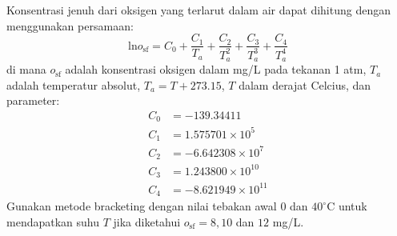 \begin{soal}
Konsentrasi jenuh dari oksigen yang terlarut dalam air dapat
dihitung dengan menggunakan persamaan:
\begin{equation*}
\mathrm{ln}o_{\mathrm{sf}} = C_{0} + \frac{C_{1}}{T_{a}} +
\frac{C_{2}}{T_{a}^{2}} + \frac{C_{3}}{T_{a}^{3}} +
\frac{C_{4}}{T_{a}^{4}}
\end{equation*}
di mana $o_{\mathrm{sf}}$ adalah konsentrasi oksigen dalam mg/L pada tekanan
1 atm, $T_{a}$ adalah temperatur absolut, $T_{a} = T + 273.15$, $T$ dalam
derajat Celcius, dan parameter:
\begin{align*}
C_{0} & = -139.34411 \\
C_{1} & = 1.575701 \times 10^5 \\
C_{2} & = -6.642308 \times 10^7 \\
C_{3} & = 1.243800 \times 10^{10} \\
C_{4} & = -8.621949 \times 10^{11}
\end{align*}
Gunakan metode bracketing dengan nilai tebakan awal $0$ dan $40^{\circ}\mathrm{C}$
untuk mendapatkan suhu $T$ jika diketahui $o_{\mathrm{sf}} = 8, 10$ dan $12$ mg/L.
\end{soal}